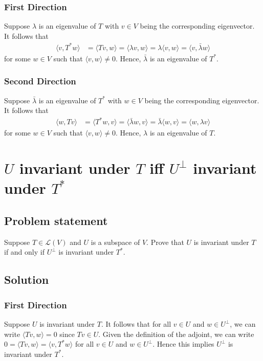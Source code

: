 \documentclass{article}
\begin{document}
\subsubsection*{First Direction}
Suppose $\lambda$ is an eigenvalue of $T$ with $v\in V$ being the corresponding eigenvector. It follows that  
\begin{align*}
    \langle v, T^* w\rangle &= \langle Tv, w\rangle = \langle \lambda v, w\rangle = \lambda \langle v, w\rangle = \langle v, \bar{\lambda}w\rangle
\end{align*}
for some $w\in V$ such that $\langle v,w\rangle\neq 0$. Hence, $\bar{\lambda}$ is an eigenvalue of $T^*$.

\subsubsection*{Second Direction}
Suppose $\bar{\lambda}$ is an eigenvalue of $T^*$ with $w\in V$ being the corresponding eigenvector. It follows that  
\begin{align*}
    \langle w, T v\rangle &= \langle T^*w, v\rangle = \langle \bar{\lambda} w, v\rangle = \bar{\lambda} \langle w, v\rangle = \langle w, \lambda v\rangle
\end{align*}
for some $w\in V$ such that $\langle v,w\rangle\neq 0$. Hence, $\lambda$ is an eigenvalue of $T$.

\clearpage

\section{$U$ invariant under $T$ iff $U^\bot$ invariant under $T^*$}
\subsection*{Problem statement}
Suppose $T\in\mathcal{L}(V)$ and $U$ is a subspace of $V$. Prove that $U$ is invariant under $T$ if and only if $U^\bot$ is invariant under $T^*$.

\subsection*{Solution}
\subsubsection*{First Direction}
Suppose $U$ is invariant under $T$. It follows that for all $v\in U$ and $w\in U^\bot$, we can write $\langle Tv,w\rangle=0$ since $Tv\in U$. Given the definition of the adjoint, we can write $0=\langle Tv,w\rangle=\langle v,T^*w\rangle$ for all $v\in U$ and $w\in U^\bot$. Hence this implies $U^\bot$ is invariant under $T^*$.
\end{document}
